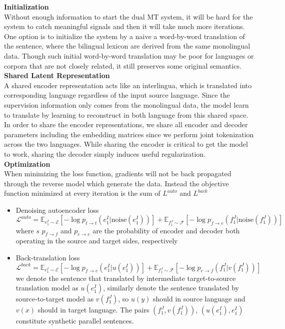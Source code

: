 \textbf{Initialization}\\
Without enough information to start the dual MT system, it will be hard for the system to catch meaningful signals and then it will take much more iterations. One option is to initialize the system by a naive a word-by-word translation of the sentence, where the bilingual lexicon are derived from the same monolingual data. Though such initial word-by-word translation may be poor for languages or corpora that are not closely related, it still preserves some  original semantics.\\


\textbf{Shared Latent Representation} \\
A shared encoder representation acts like an interlingua, which is translated into corresponding language regardless of the input source language. Since the  supervision information only comes from the monolingual data, the model learn to translate by learning to reconstruct in both language from this shared space.\\
In order to share the encoder representations, we share all encoder and decoder parameters including the embedding matrices since we perform joint tokenization across the two languages. While sharing the encoder is critical to get the model to work, sharing the decoder simply induces useful regularization.\\



\textbf{Optimization}\\
When minimizing the loss function, gradients will not be back propagated through the reverse model which generate the data. Instead the objective function minimized at every iteration is the sum of $L^{auto}$ and $L^{back}$
\begin{itemize}
	\item Denoising autoencoder loss
	\[ \mathcal{L}^{auto} = \mathbb{E}_{e_1^I \sim \mathcal{E}}[-\log p_{t\rightarrow t}(e_1^I|\text{noise}(e_1^I))] + \mathbb{E}_{f_1^J\sim \mathcal{F}} [-\log p_{f\rightarrow e}(f_1^J|\text{noise}(f_1^J))]\]
	where $s$ $p_{f\rightarrow f}$ and $p_{e\rightarrow e}$ are the probability of encoder and decoder both operating in the source and target sides, respectively
	\item Back-translation loss
	\[ \mathcal{L}^{back} = \mathbb{E}_{e_1^I\sim \mathcal{E}} [-\log p_{f\rightarrow e}(e_1^I|u(e_1^I))] +  \mathbb{E}_{f_1^J\sim \mathcal{F}} [-\log p_{e\rightarrow f}(f_1^J|v(f_1^J))]\]
	 we denote the sentence that translated by intermediate target-to-source translation model as $u(e_1^I)$, similarly denote the sentence translated by source-to-target model as $v(f_1^J)$, so $u(y)$ should in source language and $v(x)$ should in target language. The pairs $(f_1^J, v(f_1^J))$, $(u(e_1^I), e_1^I)$ constitute synthetic parallel  sentences.
\end{itemize}











